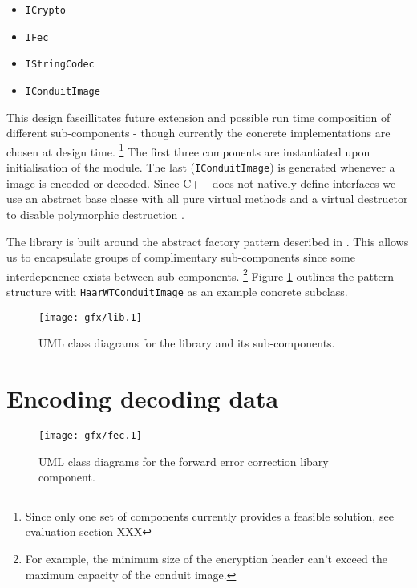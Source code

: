     \begin{itemize}
    
        \item {\tt ICrypto}
        \item {\tt IFec}
        \item {\tt IStringCodec}
        \item {\tt IConduitImage}
    
    \end{itemize}
    
    This design fascillitates future extension and possible run time composition of different sub-components - though currently the concrete implementations are chosen at design time. \footnote{Since only one set of components currently provides a feasible solution, see evaluation section XXX} The first three components are instantiated upon initialisation of the module. The last ({\tt IConduitImage}) is generated whenever a image is encoded or decoded. Since C++ does not natively define interfaces we use an abstract base classe with all pure virtual methods and a virtual destructor to disable polymorphic destruction \cite{interfaces}. 
    
    The library is built around the abstract factory pattern described in \cite{dpatterns}. This allows us to encapsulate groups of complimentary sub-components since some interdepenence exists between sub-components. \footnote{For example, the minimum size of the encryption header can't exceed the maximum capacity of the conduit image.} Figure \ref{uml:lib-classes} outlines the pattern structure with {\tt HaarWTConduitImage} as an example concrete subclass.
    
    \begin{figure}[tbph]
        \begin{center}
                \texttt{[image: gfx/lib.1]}
            \caption{UML class diagrams for the library and its sub-components.}
            \label{uml:lib-classes}
        \end{center}
    \end{figure}
    


\section{Encoding decoding data}

    \begin{figure}[tbph]
        \begin{center}
                \texttt{[image: gfx/fec.1]}
            \caption{UML class diagrams for the forward error correction libary component.}
            \label{uml:fec-classes}
        \end{center}
    \end{figure}

